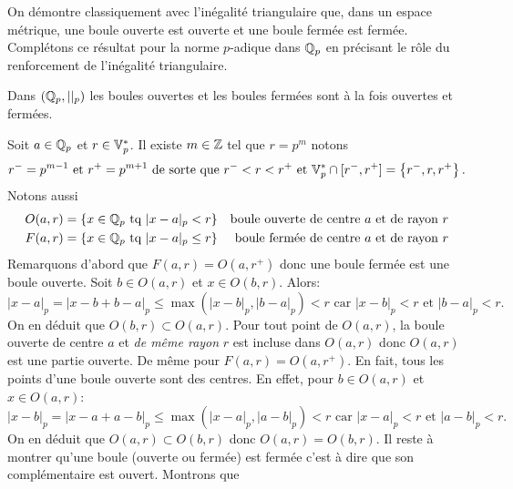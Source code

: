\noindent On démontre classiquement avec l'inégalité triangulaire que, dans un espace métrique, une boule ouverte est ouverte et une boule fermée est fermée. Complétons ce résultat pour la norme $p$-adique dans $\mathbb{Q}_p$ en précisant le rôle du renforcement de l'inégalité triangulaire. \label{prop:BoulesP-ad}
\begin{prop}
 Dans $(\mathbb{Q}_p, ||_p)$ les boules ouvertes et les boules fermées sont à la fois ouvertes et fermées.
\end{prop}
\begin{demo}
Soit $a\in \mathbb{Q}_p$ et $r\in\mathbb{V}_p^*$. Il existe $m \in \mathbb{Z}$ tel que $r= p^{m}$ notons
\begin{displaymath}
 r^- = p ^{m-1} \text{ et } r^+ = p ^{m+1} \text{ de sorte que } r^- < r < r^+ \text{ et }\mathbb{V}_p^* \cap [r^-, r^+] = \left\lbrace r^-, r, r^+\right\rbrace.
\end{displaymath}
Notons aussi
\begin{align*}
 O(a,r) &= \left\lbrace x \in\mathbb{Q}_p \text{ tq } |x-a|_p < r \right\rbrace &\text{boule ouverte de centre $a$ et de rayon $r$} \\
 F(a,r) &= \left\lbrace x \in\mathbb{Q}_p \text{ tq } |x-a|_p \leq r \right\rbrace &\text{boule fermée de centre $a$ et de rayon $r$}
\end{align*}
Remarquons d'abord que $F(a,r) = O(a,r^+)$ donc une boule fermée est une boule ouverte.\newline
Soit $b\in O(a,r)$ et $x\in O(b,r)$. Alors:
\begin{displaymath}
 |x-a|_p = |x-b + b-a|_p \leq \max(|x-b|_p,|b-a|_p) < r \text{ car } |x-b|_p < r \text{ et } |b-a|_p < r.
\end{displaymath}
On en déduit que $O(b,r)\subset O(a,r)$. Pour tout point de $O(a,r)$, la boule ouverte de centre $a$ et \emph{de même rayon } $r$ est incluse dans $O(a,r)$ donc $O(a,r)$ est une partie ouverte. De même pour $F(a,r) = O(a,r^+)$.\newline
En fait, tous les points d'une boule ouverte sont des centres. En effet, pour $b\in O(a,r)$ et $x\in O(a,r)$:
\begin{displaymath}
 |x-b|_p = |x-a + a-b|_p \leq \max(|x-a|_p,|a-b|_p) < r \text{ car } |x-a|_p < r \text{ et } |a-b|_p < r.
\end{displaymath}
On en déduit que $O(a,r)\subset O(b,r)$ donc $O(a,r) = O(b,r)$.\newline
Il reste à montrer qu'une boule (ouverte ou fermée) est fermée c'est à dire que son complémentaire est ouvert. Montrons que
\begin{displaymath}

\end{displaymath}
\end{demo}
